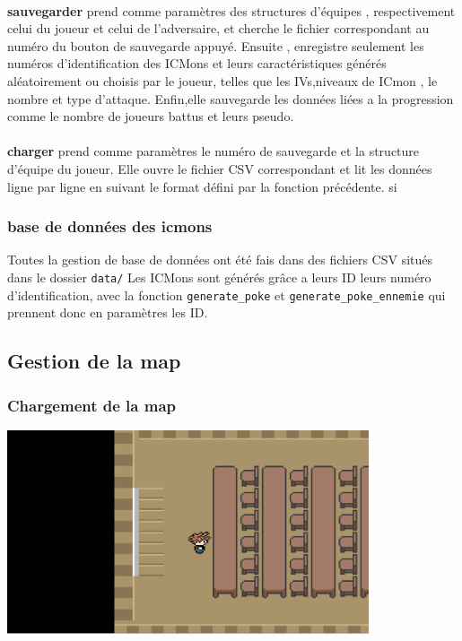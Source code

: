 \documentclass[12pt,a4paper, twoside]{article}
\begin{document}
    \paragraph{} \textbf{sauvegarder} prend comme paramètres des structures d'équipes , respectivement celui du joueur et celui de l'adversaire,
    et cherche le fichier correspondant au numéro du bouton de sauvegarde appuyé. Ensuite , enregistre seulement les numéros d'identification des ICMons et leurs caractéristiques générés aléatoirement ou choisis par le joueur, telles que les IVs,niveaux de ICmon , le nombre et type d'attaque. Enfin,elle sauvegarde les données liées a la progression
    comme le nombre de joueurs battus et leurs pseudo.
    \paragraph{} \textbf{charger} prend comme paramètres le numéro de sauvegarde et la structure d'équipe du joueur. Elle ouvre le fichier CSV
    correspondant et lit les données ligne par ligne en suivant le format défini par la fonction précédente. si 

    \subsubsection{base de données des icmons}
    Toutes la gestion de base de données ont été fais dans des fichiers CSV situés dans le dossier \texttt{data/}
    Les ICMons sont générés grâce a leurs ID leurs numéro d'identification, avec la fonction \texttt{generate\_poke} et \texttt{generate\_poke\_ennemie} qui prennent donc en paramètres les ID.

      
\newpage
\subsection{Gestion de la map}

    \subsubsection{Chargement de la map}
    \includegraphics[width=0.8\textwidth]{../docs/img/screenshots/screen2.png}
    \newline
\end{document}
